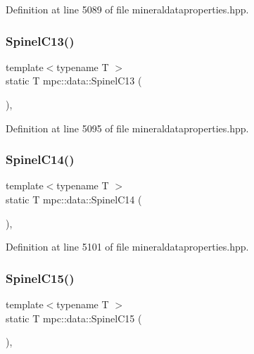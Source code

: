 Definition at line 5089 of file mineraldataproperties.\+hpp.

\mbox{\label{namespacempc_1_1data_af2ef4ab22eac3cd23bfa97027392c9a0}} 
\subsubsection{\texorpdfstring{Spinel\+C13()}{SpinelC13()}}
{\footnotesize\ttfamily template$<$typename T $>$ \\
static T mpc\+::data\+::\+Spinel\+C13 (\begin{DoxyParamCaption}{ }\end{DoxyParamCaption})\hspace{0.3cm}{\ttfamily [inline]}, {\ttfamily [static]}}



Definition at line 5095 of file mineraldataproperties.\+hpp.

\mbox{\label{namespacempc_1_1data_ace376a7c6b55479470922e49884f15f6}} 
\subsubsection{\texorpdfstring{Spinel\+C14()}{SpinelC14()}}
{\footnotesize\ttfamily template$<$typename T $>$ \\
static T mpc\+::data\+::\+Spinel\+C14 (\begin{DoxyParamCaption}{ }\end{DoxyParamCaption})\hspace{0.3cm}{\ttfamily [inline]}, {\ttfamily [static]}}



Definition at line 5101 of file mineraldataproperties.\+hpp.

\mbox{\label{namespacempc_1_1data_a68e8cc8dea549fcef1de70ecc28e6572}} 
\subsubsection{\texorpdfstring{Spinel\+C15()}{SpinelC15()}}
{\footnotesize\ttfamily template$<$typename T $>$ \\
static T mpc\+::data\+::\+Spinel\+C15 (\begin{DoxyParamCaption}{ }\end{DoxyParamCaption})\hspace{0.3cm}{\ttfamily [inline]}, {\ttfamily [static]}}



